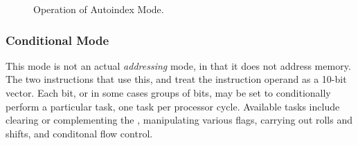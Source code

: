 \begin{figure}[htb]
 \centering
     
\caption[Autoindex Mode]{\label{fig:autoindex-mode} Operation
  of Autoindex Mode.}
\end{figure}









\subsubsection{Conditional Mode}
\label{sec:conditional-mode}

This mode is not an actual {\em addressing} mode, in that it does not address
memory. The two instructions that use this,  and  treat the
instruction operand as a 10-bit vector. Each bit, or in some cases groups of
bits, may be set to conditionally perform a particular task, one task per
processor cycle. Available tasks include clearing or complementing the \AC,
manipulating various flags, carrying out rolls and shifts, and conditonal flow
control.

